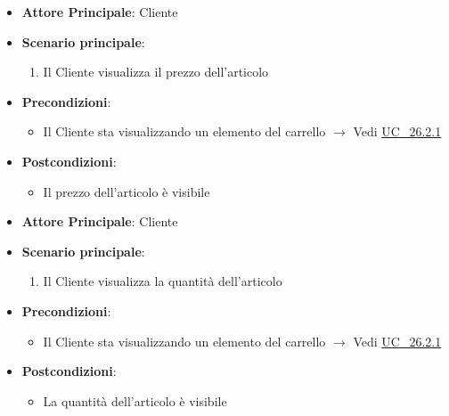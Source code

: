 \label{uc_26.2.1.2}
\begin{itemize}
    \item \textbf{Attore Principale}: Cliente
	\item \textbf{Scenario principale}: 
	\begin{enumerate}
		\item Il Cliente visualizza il prezzo dell'articolo
	\end{enumerate}
	\item \textbf{Precondizioni}: 
	\begin{itemize}
		\item Il Cliente sta visualizzando un elemento del carrello $\rightarrow$ Vedi \hyperref[uc_26.2.1]{UC\_26.2.1}
	\end{itemize}
	\item \textbf{Postcondizioni}:
	\begin{itemize}
		\item Il prezzo dell'articolo è visibile
	\end{itemize} 
\end{itemize}

\label{uc_26.2.1.3}
\begin{itemize}
    \item \textbf{Attore Principale}: Cliente
	\item \textbf{Scenario principale}: 
	\begin{enumerate}
		\item Il Cliente visualizza la quantità dell'articolo
	\end{enumerate}
	\item \textbf{Precondizioni}: 
	\begin{itemize}
		\item Il Cliente sta visualizzando un elemento del carrello $\rightarrow$ Vedi \hyperref[uc_26.2.1]{UC\_26.2.1}
	\end{itemize}
	\item \textbf{Postcondizioni}:
	\begin{itemize}
		\item La quantità dell'articolo è visibile
	\end{itemize} 
\end{itemize}

